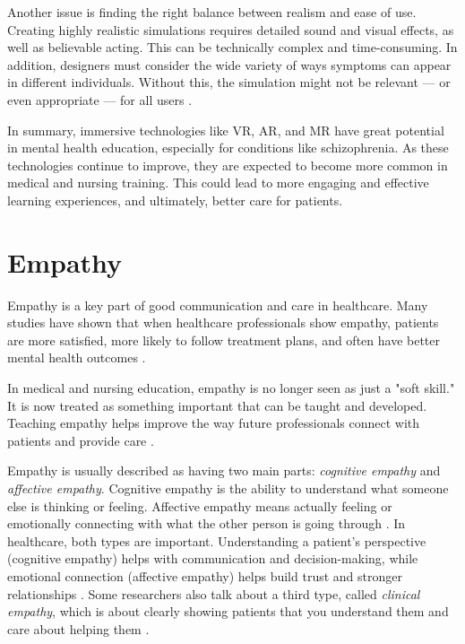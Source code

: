 Another issue is finding the right balance between realism and ease of use. Creating highly realistic simulations requires detailed sound and visual effects, as well as believable acting. This can be technically complex and time-consuming. In addition, designers must consider the wide variety of ways symptoms can appear in different individuals. Without this, the simulation might not be relevant — or even appropriate — for all users \cite{Zare-Bidaki2022}.

In summary, immersive technologies like VR, AR, and MR have great potential in mental health education, especially for conditions like schizophrenia. As these technologies continue to improve, they are expected to become more common in medical and nursing training. This could lead to more engaging and effective learning experiences, and ultimately, better care for patients.


\section{Empathy}

Empathy is a key part of good communication and care in healthcare. Many studies have shown that when healthcare professionals show empathy, patients are more satisfied, more likely to follow treatment plans, and often have better mental health outcomes \cite{Cunico2012, Olson1995, Ozcan2018}.

In medical and nursing education, empathy is no longer seen as just a "soft skill." It is now treated as something important that can be taught and developed. Teaching empathy helps improve the way future professionals connect with patients and provide care \cite{Cunico2012}.

Empathy is usually described as having two main parts: \textit{cognitive empathy} and \textit{affective empathy}. Cognitive empathy is the ability to understand what someone else is thinking or feeling. Affective empathy means actually feeling or emotionally connecting with what the other person is going through \cite{Ventura2020, Martingano2021}. In healthcare, both types are important. Understanding a patient's perspective (cognitive empathy) helps with communication and decision-making, while emotional connection (affective empathy) helps build trust and stronger relationships \cite{Cunico2012, Ozcan2018}. Some researchers also talk about a third type, called \textit{clinical empathy}, which is about clearly showing patients that you understand them and care about helping them \cite{Hojat2002}.

